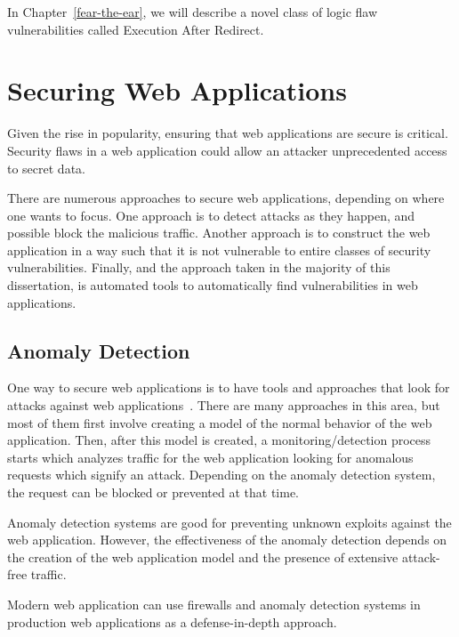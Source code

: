 In Chapter~\ref{fear-the-ear}, we will describe a novel class of logic
flaw vulnerabilities called Execution After Redirect.

\section{Securing Web Applications}

Given the rise in popularity, ensuring that web applications are
secure is critical. Security flaws in a web application could allow an
attacker unprecedented access to secret data. 

There are numerous approaches to secure web applications, depending on
where one wants to focus. One approach is to detect attacks as they
happen, and possible block the malicious traffic. Another approach is
to construct the web application in a way such that it is not
vulnerable to entire classes of security vulnerabilities. Finally, and
the approach taken in the majority of this dissertation, is automated
tools to automatically find vulnerabilities in web applications.


\subsection{Anomaly Detection}

One way to secure web applications is to have tools and approaches
that look for attacks against web
applications~\cite{robertson09:dissertation}. There are many
approaches in this area, but most of them first involve creating a
model of the normal behavior of the web application. Then, after this
model is created, a monitoring/detection process starts which analyzes
traffic for the web application looking for anomalous requests which
signify an attack. Depending on the anomaly detection system, the
request can be blocked or prevented at that time. 

Anomaly detection systems are good for preventing unknown
exploits against the web application. However, the effectiveness of
the anomaly detection depends on the creation of the web application
model and the presence of extensive attack-free traffic. 

Modern web application can use firewalls and anomaly detection systems
in production web applications as a defense-in-depth approach. 


